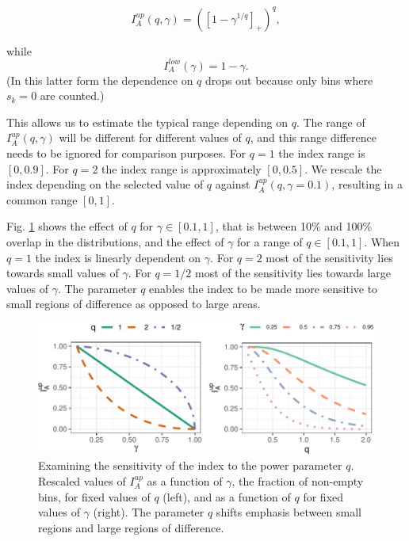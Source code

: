 \documentclass[]{interact}
\theoremstyle{plain}%
\theoremstyle{definition}
\theoremstyle{remark}
\begin{document}
\begin{equation}
I_A^{up}(q, \gamma) = ([1-\gamma^{1/q}]_+)^q,
\label{eq:p1}
\end{equation}

\noindent while \begin{equation}
I_A^{low}(\gamma) = 1-\gamma.
\end{equation} (In this latter form the dependence on \(q\) drops out
because only bins where \(s_k=0\) are counted.)

This allows us to estimate the typical range depending on \(q\). The
range of \(I_A^{up}(q, \gamma)\) will be different for different values
of \(q\), and this range difference needs to be ignored for comparison
purposes. For \(q=1\) the index range is \([0,0.9]\). For \(q=2\) the
index range is approximately \([0, 0.5]\). We rescale the index
depending on the selected value of \(q\) against
\(I_A^{up}(q, \gamma=0.1)\), resulting in a common range \([0,1]\).

Fig. \ref{fig:behavior} shows the effect of \(q\) for
\(\gamma \in [0.1, 1]\), that is between 10\% and 100\% overlap in the
distributions, and the effect of \(\gamma\) for a range of
\(q \in [0.1, 1]\). When \(q=1\) the index is linearly dependent on
\(\gamma\). For \(q=2\) most of the sensitivity lies towards small
values of \(\gamma\). For \(q=1/2\) most of the sensitivity lies towards
large values of \(\gamma\). The parameter \(q\) enables the index to be
made more sensitive to small regions of difference as opposed to large
areas.

\begin{figure}

{\centering \includegraphics[width=1\linewidth]{section_pursuit_files/figure-latex/behavior-1} 

}

\caption{Examining the sensitivity of the index to the power parameter $q$. Rescaled values of $I_A^{up}$ as a function of $\gamma$, the fraction of non-empty bins, for fixed values of $q$ (left), and as a function of $q$ for fixed values of $\gamma$ (right). The parameter $q$ shifts emphasis between small regions and large regions of difference.}\label{fig:behavior}
\end{figure}
\end{document}
